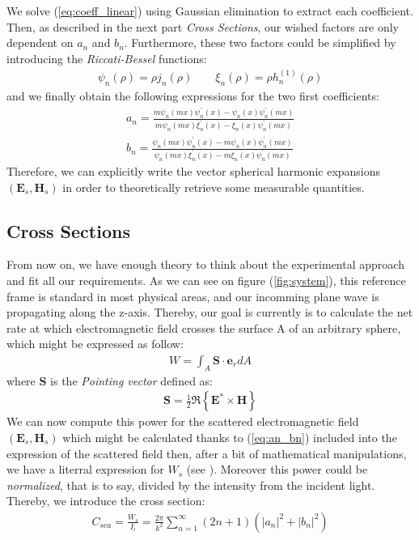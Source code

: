 \documentclass{article}
\numberwithin{equation}{section}
\begin{document}
We solve (\ref{eq:coeff_linear}) using Gaussian elimination to extract each coefficient. Then, as described in the next part \textit{Cross Sections}, our wished factors are only dependent on $a_{n}$ and $b_{n}$. Furthermore, these two factors could be simplified by introducing the \textit{Riccati-Bessel} functions:
\begin{align}
\psi_{n}(\rho)=\rho j_{n}(\rho) \qquad \xi_{n}(\rho)=\rho h^{(1)}_{n}(\rho)
\end{align}
and we finally obtain the following expressions for the two first coefficients:
\begin{equation}\label{eq:an_bn}
\begin{aligned}
a_{n} = \frac{m\psi_{n}(mx)\psi^{'}_{n}(x)-\psi_{n}(x)\psi^{'}_{n}(mx)}{m\psi_{n}(mx)\xi^{'}_{n}(x)-\xi_{n}(x)\psi^{'}_{n}(mx)}\\
b_{n} = \frac{\psi_{n}(mx)\psi^{'}_{n}(x)-m\psi_{n}(x)\psi^{'}_{n}(mx)}{\psi_{n}(mx)\xi^{'}_{n}(x)-m\xi_{n}(x)\psi^{'}_{n}(mx)}
\end{aligned}
\end{equation}
Therefore, we can explicitly write the vector spherical harmonic expansions $(\textbf{E}_{s}, \textbf{H}_{s})$ in order to theoretically retrieve some measurable quantities.

\subsection{Cross Sections}

From now on, we have enough theory to think about the experimental approach and fit all our requirements. As we can see on figure (\ref{fig:system}), this reference frame is standard in most physical areas, and our incomming plane wave is propagating along the z-axis. Thereby, our goal is currently is to calculate the net rate at which electromagnetic field crosses the surface A of an arbitrary sphere, which might be expressed as follow:
\begin{align}\label{eq:power_def}
W=\int_{A}^{}\textbf{S}\cdot \textbf{e}_{r}dA
\end{align}
where $\textbf{S}$ is the \textit{Pointing vector} defined as:
\begin{align}
\textbf{S} = \frac{1}{2}\Re\left\{\textbf{E}^{*} \times \textbf{H}\right\}
\end{align}
We can now compute this power for the scattered electromagnetic field $(\textbf{E}_{s}, \textbf{H}_{s})$ which might be calculated thanks to (\ref{eq:an_bn}) included into the expression of the scattered field then, after a bit of mathematical manipulations, we have a literral expression for $W_{s}$ (see \cite{craigdonald}). Moreover this power could be \textit{normalized}, that is to say, divided by the intensity from the incident light. Thereby, we introduce the cross section:
\begin{align}\label{eq:csca}
C_{sca}=\frac{W_{s}}{I_{i}}=\frac{2\pi}{k^{2}}\sum_{n=1}^{\infty }(2n+1)(\left| a_{n} \right|^{2}+\left| b_{n} \right|^{2})
\end{align}
\end{document}

